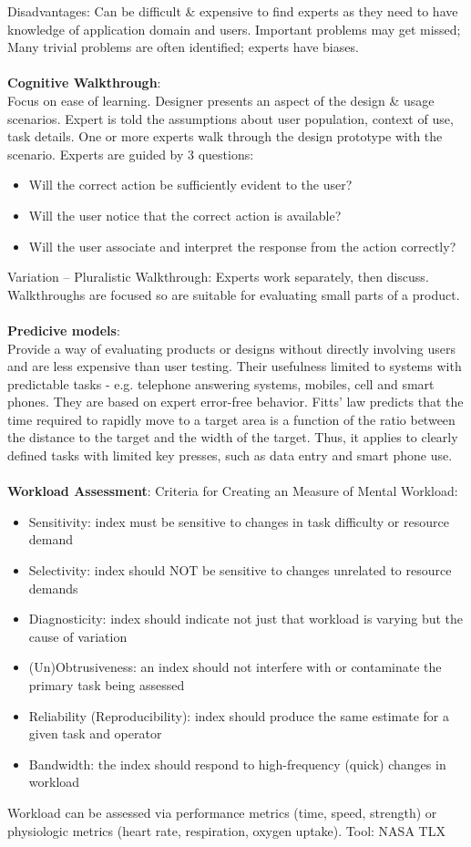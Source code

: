 Disadvantages: Can be difficult \& expensive to find experts as they need to have knowledge of application domain and users. Important problems may get missed; Many trivial problems are often identified; experts have biases.\\\\
\textbf{Cognitive Walkthrough}:\\
Focus on ease of learning. Designer presents an aspect of the design \& usage scenarios. Expert is told the assumptions about user population, context of use, task details. One or more experts walk through the design prototype with the scenario. Experts are guided by 3 questions:
\begin{itemize}
\item Will the correct action be sufficiently evident to the user?
\item Will the user notice that the correct action is available?
\item Will the user associate and interpret the response from the action correctly?
\end{itemize}
Variation -- Pluralistic Walkthrough: Experts work separately, then discuss. Walkthroughs are focused so are suitable for evaluating small parts of a product. \\\\
\textbf{Predicive models}:\\
Provide a way of evaluating products or designs without directly involving users and are less expensive than user testing. Their usefulness limited to systems with predictable
tasks - e.g. telephone answering systems, mobiles, cell and smart phones. They are based on expert error-free behavior. Fitts' law predicts that the time required to rapidly move to a target area is a function of the ratio between the distance to the target and the width of the target. Thus, it applies to clearly defined tasks with limited key presses, such as data entry and smart phone use.\\\\
\textbf{Workload Assessment}: Criteria for Creating an Measure of Mental Workload:
\begin{itemize}
\item Sensitivity: index must be sensitive to changes in task difficulty or resource demand
\item Selectivity: index should NOT be sensitive to changes unrelated to resource demands
\item Diagnosticity: index should indicate not just that workload is varying but the cause of variation
\item (Un)Obtrusiveness: an index should not interfere with or contaminate the primary task being assessed
\item Reliability (Reproducibility): index should produce the same estimate for a given task and operator
\item Bandwidth: the index should respond to high-frequency (quick) changes in workload
\end{itemize}
Workload can be assessed via performance metrics (time, speed, strength) or physiologic metrics (heart rate, respiration, oxygen uptake). 
Tool: NASA TLX
